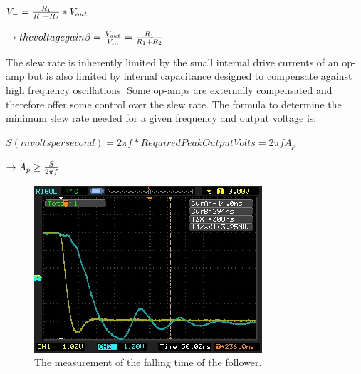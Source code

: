 \documentclass[11pt]{article}
\begin{document}
$V_{-}={R_{1}\over R_{1}+R_{2}}*V_{out}$

$\rightarrow the voltage gain \beta = {V_{out}\over V_{in}}={R_{1}\over R_{1}+R_{2}}$

The slew rate is inherently limited by the small internal drive currents of an op-amp but is also limited by internal capacitance designed to compensate against high frequency oscillations. Some op-amps are externally compensated and therefore offer some control over the slew rate. The formula to determine the minimum slew rate needed for a given frequency and output voltage is:

$S(in volts per second)=2\pi f*Required Peak Output Volts=2\pi fA_{p}$

$\rightarrow A_{p}\geq {S\over 2\pi f}$


\begin{figure}[H]
 \begin{center}
  \includegraphics[width=\linewidth/1]{act1falling}
  \caption{The measurement of the falling time of the follower.}
  \label{fig:act1falling}
 \end{center}
\end{figure}
\end{document}
